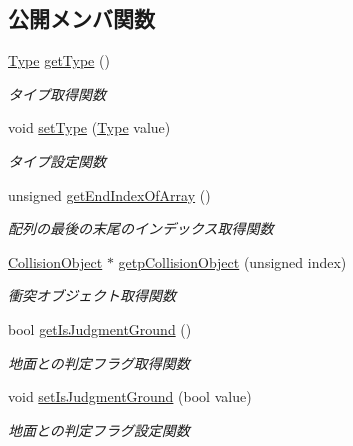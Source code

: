 \subsection*{公開メンバ関数}
\begin{DoxyCompactItemize}
\item 
\mbox{\hyperlink{class_collision_base_a18dc0d5461742083ca12013fe9ff1a20}{Type}} \mbox{\hyperlink{class_collision_base_a9ab6ff88dc0379278229342d4e016744}{get\+Type}} ()
\begin{DoxyCompactList}\small\item\em タイプ取得関数 \end{DoxyCompactList}\item 
void \mbox{\hyperlink{class_collision_base_ada12dae7057600b363751efa910050f4}{set\+Type}} (\mbox{\hyperlink{class_collision_base_a18dc0d5461742083ca12013fe9ff1a20}{Type}} value)
\begin{DoxyCompactList}\small\item\em タイプ設定関数 \end{DoxyCompactList}\item 
unsigned \mbox{\hyperlink{class_collision_base_ac1d7000c820fabfa604138cda30a40a1}{get\+End\+Index\+Of\+Array}} ()
\begin{DoxyCompactList}\small\item\em 配列の最後の末尾のインデックス取得関数 \end{DoxyCompactList}\item 
\mbox{\hyperlink{class_collision_object}{Collision\+Object}} $\ast$ \mbox{\hyperlink{class_collision_base_a7d5e65d7112a60a98b5557eb5be0ba94}{getp\+Collision\+Object}} (unsigned index)
\begin{DoxyCompactList}\small\item\em 衝突オブジェクト取得関数 \end{DoxyCompactList}\item 
bool \mbox{\hyperlink{class_collision_base_a7b9cd927976308f8719f3becc03b99a1}{get\+Is\+Judgment\+Ground}} ()
\begin{DoxyCompactList}\small\item\em 地面との判定フラグ取得関数 \end{DoxyCompactList}\item 
void \mbox{\hyperlink{class_collision_base_a231cb5c715701444db63db030c06b694}{set\+Is\+Judgment\+Ground}} (bool value)
\begin{DoxyCompactList}\small\item\em 地面との判定フラグ設定関数 \end{DoxyCompactList}\item 

\end{DoxyCompactItemize}
